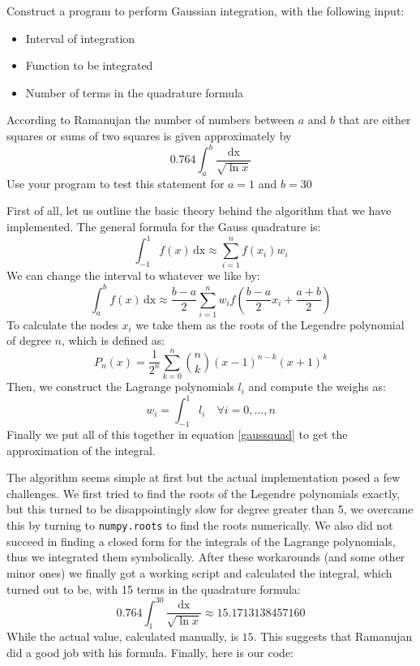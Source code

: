 \begin{problem}
Construct a program to perform Gaussian integration, with the following input:
\begin{itemize}
\item Interval of integration
\item Function to be integrated
\item Number of terms in the quadrature formula
\end{itemize}
According to Ramanujan the number of numbers between $a$ and $b$ that are either squares or sums of two squares is given approximately by
\begin{equation*}
0.764\int_a^b \frac{\text{dx}}{\sqrt{\ln x}}
\end{equation*}
Use your program to test this statement for $a=1$ and $b=30$
\end{problem}

\begin{solution}
First of all, let us outline the basic theory behind the algorithm that we have implemented. The general formula for the Gauss quadrature is:
\begin{equation*}
\int_{-1}^1 f(x) \, \text{dx} \approx \sum_{i=1}^n f(x_i)w_i
\end{equation*}
We can change the interval to whatever we like by:
\begin{equation}
\int_a^b f(x) \, \text{dx} \approx \frac{b-a}{2} \sum_{i=1}^n w_i f\left(\frac{b-a}{2}x_i+\frac{a+b}{2}\right)
\label{gaussquad}
\end{equation}
To calculate the nodes $x_i$ we take them as the roots of the Legendre polynomial of degree $n$, which is defined as:
\begin{equation*}
P_n(x) = \frac{1}{2^n} \sum_{k=0}^n \binom{n}{k} (x-1)^{n-k}(x+1)^k
\end{equation*}
Then, we construct the Lagrange polynomials $l_i$ and compute the weighs as:
\begin{equation*}
w_i = \int_{-1}^1 l_i \quad \forall i = 0, \ldots, n
\end{equation*}
Finally we put all of this together in equation \ref{gaussquad} to get the approximation of the integral.

The algorithm seems simple at first but the actual implementation posed a few challenges. We first tried to find the roots of the Legendre polynomials exactly, but this turned to be disappointingly slow for degree greater than 5, we overcame this by turning to \texttt{numpy.roots} to find the roots numerically. We also did not succeed in finding a closed form for the integrals of the Lagrange polynomials, thus we integrated them symbolically. After these workarounds (and some other minor ones) we finally got a working script and calculated the integral, which turned out to be, with 15 terms in the quadrature formula:
\begin{equation*}
0.764 \int_1^{30} \frac{\text{dx}}{\sqrt{\ln x}} \approx 15.1713138457160
\end{equation*}
While the actual value, calculated manually, is $15$. This suggests that Ramanujan did a good job with his formula. Finally, here is our code:

\end{solution}
\newpage

